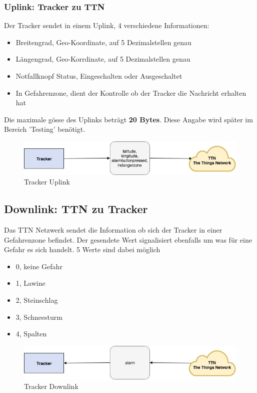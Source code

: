 \documentclass[11pt,english,german]{report}
\theoremstyle{definition}
\begin{document}
\subsubsection{Uplink: Tracker zu TTN}
Der Tracker sendet in einem Uplink, 4 verschiedene Informationen:
\begin{itemize}
	\item Breitengrad, Geo-Koordinate, auf 5 Dezimalstellen genau
	\item Längengrad, Geo-Korrdinate, auf 5 Dezimalstellen genau
	\item Notfallknopf Status, Eingeschalten oder Ausgeschaltet
	\item In Gefahrenzone, dient der Kontrolle ob der Tracker die Nachricht erhalten hat
\end{itemize}
Die maximale gösse des Uplinks beträgt \textbf{20 Bytes}. Diese Angabe wird später im Bereich 'Testing' benötigt.
\begin{figure}[H]
	\centering
	\includegraphics[width=\textwidth]{img/system/dataflow_tracker2ttn_uplink.jpg}
	\caption[Tracker Uplink]
	{Tracker Uplink}
\end{figure}

\subsection{Downlink: TTN zu Tracker}
Das TTN Netzwerk sendet die Information ob sich der Tracker in einer Gefahrenzone befindet. Der gesendete Wert signalisiert ebenfalls um was für eine Gefahr es sich handelt. 5 Werte sind dabei möglich
\begin{itemize}
	\item 0, keine Gefahr
	\item 1, Lawine
	\item 2, Steinschlag
	\item 3, Schneesturm
	\item 4, Spalten
\end{itemize}

\begin{figure}[H]
	\centering
	\includegraphics[width=\textwidth]{img/system/dataflow_tracker2ttn_downlink.jpg}
	\caption[Tracker Downlink]
	{Tracker Downlink}
\end{figure}
\end{document}
